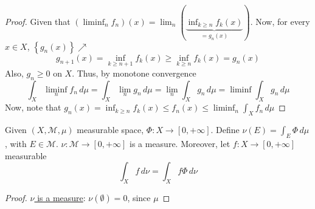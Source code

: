 \begin{proof}
    Given that \((\liminf_n f_n)(x) = \lim_n (\underbrace{\inf_{k \geq n} f_k(x)}_{= g_n (x)})\). Now, for every \(x \in X\), \(\left\{ g_n(x) \right\}\nearrow\)
    \[
        g_{n+1}(x) = \inf_{k \geq n+1} f_k(x) \geq \inf_{k \geq n} f_k(x) = g_n (x)
    \]
    Also, \(g_n \geq 0\) on \(X\). Thus, by monotone convergence
    \[
        \int_X \liminf_n f_n \, d\mu = \int_X \lim_n g_n \, d\mu = \lim_n \int_X g_n \, d\mu = \liminf \int_X g_n \, d\mu
    \]
    Now, note that \(g_n (x) = \inf_{k\geq n} f_k(x) \leq f_n(x) \leq \liminf_n \int_X f_n \, d\mu\) 
\end{proof}
\begin{theorem}
    Given \((X, \mathcal{M}, \mu)\) measurable space, \(\Phi : X \to [0, +\infty]\). Define \(\nu(E) = \int_E \Phi \, d\mu\), with \(E \in \mathcal{M}\). \(\nu : \mathcal{M} \to [0, +\infty]\) is a measure. Moreover, let \(f:X \to [0, +\infty]\) measurable
    \[
        \int_X f \, d\nu = \int_X f\Phi \, d\nu \tag*{*}
    \]
\end{theorem}
\begin{proof}
    \underline{\(\nu\) is a measure}:  
    \(\nu(\emptyset) = 0\), since \(\mu\)
\end{proof}
